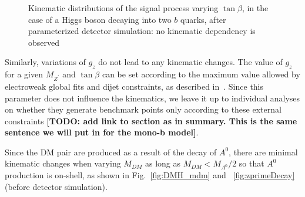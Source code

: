 \begin{figure}[h!]
\centering
{}
\hfill
{}
\caption{Kinematic distributions of the signal process varying $\tan{\beta}$, in the case of a Higgs boson decaying into two $b$ quarks,
	after parameterized detector simulation: no kinematic dependency is observed}
\label{fig:DMH_tanbeta}
\end{figure}

Similarly, variations of $g_z$ do not lead to any kinematic changes. 
The value of $g_z$ for a given $M_{Z^\prime}$ and $\tan \beta$ can be set according to the maximum value allowed by electroweak global 
fits and dijet constraints, as described in~\cite{Berlin:2014cfa}. Since this parameter does not influence the kinematics, 
we leave it up to individual analyses on whether they generate benchmark points only according to these external constraints
\textbf{[TODO: add link to section as in summary. This is the same sentence we will put in for the mono-b model]}.   

Since the DM pair are produced as a result of the decay of $A^0$, there are minimal kinematic changes when varying $M_{DM}$ 
as long as $M_{DM}<M_{A^0}/2$ so that $A^0$ production is on-shell, as shown in Fig.~\ref{fig:DMH_mdm} and~
\ref{fig:zprimeDecay} (before detector simulation). 

